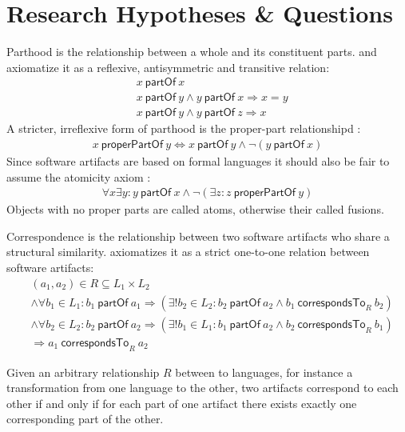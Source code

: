 \documentclass[runningheads,a4paper]{llncs}
\newcommand{\partOf}{~\textsf{partOf}~}
\newcommand{\properPartOf}{~\textsf{properPartOf}~}
\newcommand{\correspondsToR}[1]{~\textsf{correspondsTo}_{#1}~}
\begin{document}
\section{Research Hypotheses \& Questions}
\label{section:ResearchHypthesesAndQuestions}
Parthood is the relationship between a whole and its constituent parts.
\cite{DBLP:journals/dke/Varzi96} and \cite{DBLP:conf/sle/Lammel16} axiomatize it as a reflexive, antisymmetric and transitive relation:
\begin{align*}
&x \partOf x
\\&x \partOf y \wedge y \partOf x \Rightarrow x = y
\\&x \partOf y \wedge y \partOf z \Rightarrow x
\end{align*}
A stricter, irreflexive form of parthood is the proper-part relationshipd \cite{DBLP:journals/dke/Varzi96}:
\begin{align*}
x \properPartOf y
\Leftrightarrow
x \partOf y \wedge \neg(y \partOf x)
\end{align*}
Since software artifacts are based on formal languages it should also be fair to assume the atomicity axiom \cite{DBLP:journals/dke/Varzi96}:
\begin{align*}
\forall x \exists y : 
y \partOf x \wedge \neg(\exists z : z \properPartOf y)
\end{align*}
Objects with no proper parts are called atoms, otherwise their called fusions.

Correspondence is the relationship between two software artifacts who share a structural similarity.
\cite{DBLP:conf/sle/Lammel16} axiomatizes it as a strict one-to-one relation between software artifacts:
\begin{align*}
&(a_1,a_2) \in R \subseteq L_1 \times L_2
\\&\wedge \forall b_1 \in L_1 : b_1 \partOf a_1 \Rightarrow (\exists! b_2 \in L_2 : b_2 \partOf a_2 \wedge b_1 \correspondsToR{R} b_2 )
\\&\wedge \forall b_2 \in L_2 : b_2 \partOf a_2 \Rightarrow (\exists! b_1 \in L_1 : b_1 \partOf a_2 \wedge b_2 \correspondsToR{R} b_1 )
\\&\Rightarrow a_1 \correspondsToR{R} a_2
\end{align*}

Given an arbitrary relationship $R$ between to languages, for instance a transformation from one language to the other, two artifacts correspond to each other if and only if for each part of one artifact there exists exactly one corresponding part of the other.
\end{document}
